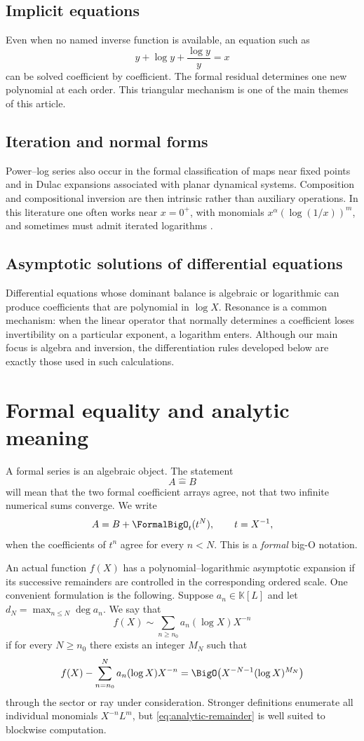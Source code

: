 \documentclass[11pt,openany]{book}
\theoremstyle{definition}
\theoremstyle{plain}
\theoremstyle{remark}
\newcommand{\K}{\mathbb{K}}
\newcommand{\wideeq}{\mathrel{\widehat{=}}}
\begin{document}
\subsection{Implicit equations}
Even when no named inverse function is available, an equation such as
\[
 y+\log y+\frac{\log y}{y}=x
\]
can be solved coefficient by coefficient.  The formal residual determines one
new polynomial at each order.  This triangular mechanism is one of the main
themes of this article.

\subsection{Iteration and normal forms}
Power--log series also occur in the formal classification of maps near fixed
points and in Dulac expansions associated with planar dynamical systems.
Composition and compositional inversion are then intrinsic rather than
auxiliary operations.  In this literature one often works near \(x=0^+\), with
monomials \(x^\alpha(\log(1/x))^m\), and sometimes must admit iterated
logarithms \cite{mardesic-powerlog,mardesic-dulac,peran-logarithmic}.

\subsection{Asymptotic solutions of differential equations}
Differential equations whose dominant balance is algebraic or logarithmic can
produce coefficients that are polynomial in \(\log X\).  Resonance is a common
mechanism: when the linear operator that normally determines a coefficient
loses invertibility on a particular exponent, a logarithm enters.  Although
our main focus is algebra and inversion, the differentiation rules developed
below are exactly those used in such calculations.

\section{Formal equality and analytic meaning}
A formal series is an algebraic object.  The statement
\[
 A\wideeq B
\]
will mean that the two formal coefficient arrays agree, not that two infinite
numerical sums converge.  We write
\[
 A=B+\FormalBigO_t(t^N),\qquad t=X^{-1},
\]
when the coefficients of \(t^n\) agree for every \(n<N\).  This is a
\emph{formal} big-O notation.

An actual function \(f(X)\) has a polynomial--logarithmic asymptotic expansion
if its successive remainders are controlled in the corresponding ordered
scale.  One convenient formulation is the following.  Suppose
\(a_n\in\K[L]\) and let \(d_N=\max_{n\le N}\deg a_n\).  We say that
\[
 f(X)\sim\sum_{n\ge n_0}a_n(\log X)X^{-n}
\]
if for every \(N\ge n_0\) there exists an integer \(M_N\) such that
\begin{equation}\label{eq:analytic-remainder}
 f(X)-\sum_{n=n_0}^{N}a_n(\log X)X^{-n}
 =\BigO\!\left(X^{-N-1}(\log X)^{M_N}\right)
\end{equation}
through the sector or ray under consideration.  Stronger definitions enumerate
all individual monomials \(X^{-n}L^m\), but
\cref{eq:analytic-remainder} is well suited to blockwise computation.
\end{document}
